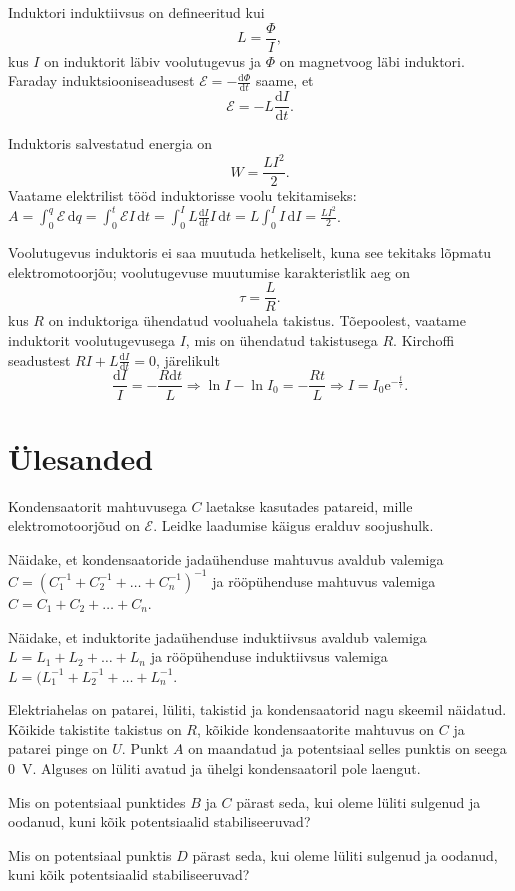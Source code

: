 \documentclass[a4paper,11pt,twocolumn]{article}
\begin{document}
Induktori induktiivsus on defineeritud kui
\[
L=\frac{\Phi}{I}
,\] kus $I$ on induktorit läbiv voolutugevus ja $\Phi$ on magnetvoog läbi induktori.
Faraday induktsiooniseadusest $\mathcal{E}= -\frac{\mathrm{d}\Phi}{\mathrm{d}t}$ saame, et
\[
\mathcal{E}=-L \frac{\mathrm{d}I}{\mathrm{d}t}
.\]

Induktoris salvestatud energia on
\[
W=\frac{LI^2}{2}
.\]
Vaatame elektrilist tööd induktorisse voolu tekitamiseks: $A=\int_0^{q}\mathcal{E}\, \mathrm{d}q=\int_0^{t} \mathcal{E} I \, \mathrm{d}t=\int_0^{I}L \frac{\mathrm{d}I}{\mathrm{d}t} I \, \mathrm{d}t = L \int_0^{I}I \, \mathrm{d}I=\frac{LI^2}{2}$.

Voolutugevus induktoris ei saa muutuda hetkeliselt, kuna see tekitaks lõpmatu elektromotoorjõu; voolutugevuse muutumise karakteristlik aeg on
\[
\tau=\frac{L}{R}
.\] kus $R$ on induktoriga ühendatud vooluahela takistus.
Tõepoolest, vaatame induktorit voolutugevusega $I$, mis on ühendatud takistusega $R$. Kirchoffi seadustest $RI+L \frac{\mathrm{d}I}{\mathrm{d}t}=0$, järelikult
\[
    \frac{\mathrm{d} I}{I}=-\frac{R \mathrm{d} t}{L} \Rightarrow \ln I-\ln I_{0}=-\frac{R t}{L} \Rightarrow I=I_{0} \mathrm{e}^{-\frac{t}{\tau}}
.\]

\section{Ülesanded}
\begin{question}
    Kondensaatorit mahtuvusega $C$ laetakse kasutades patareid, mille elektromotoorjõud on $\mathcal{E}$. Leidke laadumise käigus eralduv soojushulk.
\end{question}

\begin{question}
    Näidake, et kondensaatoride jadaühenduse mahtuvus avaldub valemiga $C=(C_1^{-1} + C_2^{-1} + \ldots + C_n^{-1})^{-1}$ ja rööpühenduse mahtuvus valemiga $C=C_1+C_2+\ldots + C_n$.
\end{question}

\begin{question}
    Näidake, et induktorite jadaühenduse induktiivsus avaldub valemiga $L=L_1+L_2+\ldots+L_n$ ja rööpühenduse induktiivsus valemiga $L=(L_1^{-1}+L_2^{-1}+\ldots+ L_n^{-1}$.
\end{question}

\begin{question}[NBPhO 2017, P3][vv1][2.9cm]
    Elektriahelas on patarei, lüliti, takistid ja kondensaatorid nagu skeemil näidatud. Kõikide takistite takistus on $R$, kõikide kondensaatorite mahtuvus on $C$ ja patarei pinge on $U$. Punkt $A$ on maandatud ja potentsiaal selles punktis on seega \SI{0}{V}. Alguses on lüliti avatud ja ühelgi kondensaatoril pole laengut.
    \begin{subquestion}
    \item Mis on potentsiaal punktides $B$ ja $C$ pärast seda, kui oleme lüliti sulgenud ja oodanud, kuni kõik potentsiaalid stabiliseeruvad?
    \item  Mis on potentsiaal punktis $D$ pärast seda, kui oleme lüliti sulgenud ja oodanud, kuni kõik potentsiaalid stabiliseeruvad?
    \end{subquestion}
\end{question}
\end{document}
